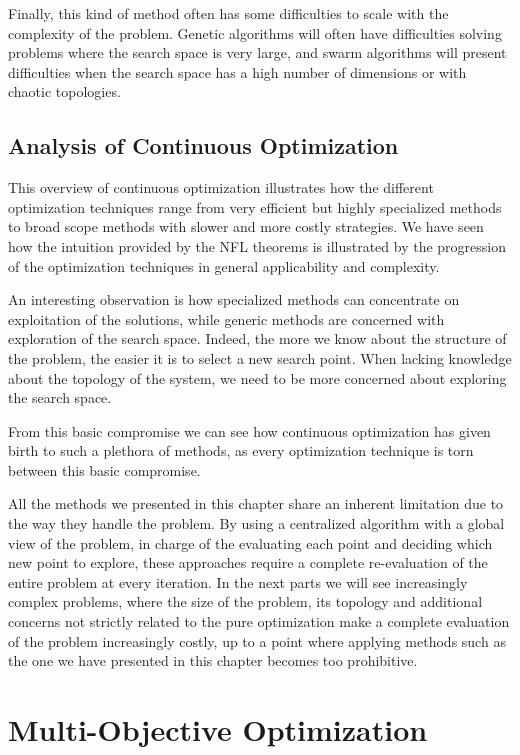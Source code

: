 Finally, this kind of method often has some difficulties to scale with the complexity of the problem. Genetic algorithms will often have difficulties solving problems where the search space is very large, and swarm algorithms will present difficulties when the search space has a high number of dimensions or with chaotic topologies.

\section{Analysis of Continuous Optimization}

This overview of continuous optimization illustrates how the different optimization techniques range from very efficient but highly specialized methods to broad scope methods with slower and more costly strategies.
We have seen how the intuition provided by the NFL theorems is illustrated by the progression of the optimization techniques in general applicability and complexity.

An interesting observation is how specialized methods can concentrate on exploitation of the solutions, while generic methods are concerned with exploration of the search space. Indeed, the more we know about the structure of the problem, the easier it is to select a new search point. When lacking knowledge about the topology of the system, we need to be more concerned about exploring the search space.

From this basic compromise we can see how continuous optimization has given birth to such a plethora of methods, as every optimization technique is torn between this basic compromise.

All the methods we presented in this chapter share an inherent limitation due to the way they handle the problem. By using a centralized algorithm with a global view of the problem, in charge of the evaluating each point and deciding which new point to explore, these approaches require a complete re-evaluation of the entire problem at every iteration. In the next parts we will see increasingly complex problems, where the size of the problem, its topology and additional concerns not strictly related to the pure optimization make a complete evaluation of the problem increasingly costly, up to a point where applying methods such as the one we have presented in this chapter becomes too prohibitive.

\chapter{Multi-Objective Optimization}

